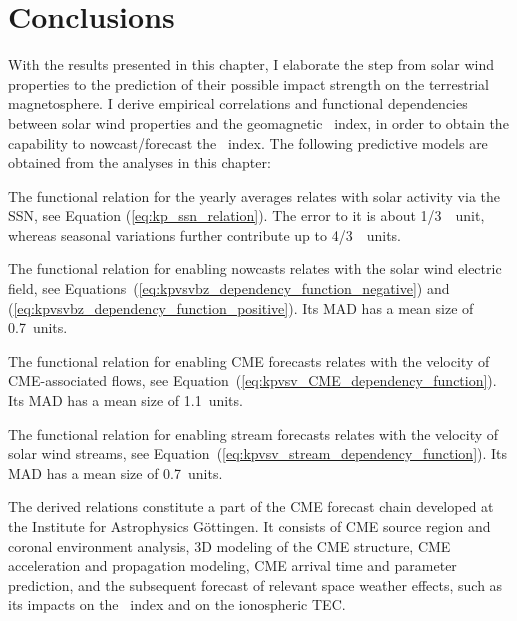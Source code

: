 

\section{Conclusions}
\label{sec:conclusions_ch2}
With the results presented in this chapter, I elaborate the step from solar wind properties to the prediction of their possible impact strength on the terrestrial magnetosphere. I derive empirical correlations and functional dependencies between solar wind properties and the geomagnetic \Kp~index, in order to obtain the capability to nowcast/forecast the \Kp~index. The following predictive models are obtained from the \Kp{} analyses in this chapter:
\begin{itemize*}
	\item The functional relation for the yearly \Kp{} averages relates \Kp{} with solar activity via the SSN, see Equation (\ref{eq:kp_ssn_relation}). The error to it is about 1/3~\Kp{}~unit, whereas seasonal variations further contribute up to 4/3~\Kp{}~units.
	\item The functional relation for enabling \Kp{} nowcasts relates \Kp{} with the solar wind electric field, see Equations~(\ref{eq:kpvsvbz_dependency_function_negative}) and (\ref{eq:kpvsvbz_dependency_function_positive}). Its MAD has a mean size of \SI{0.7}{\Kp}~units.
	\item The functional relation for enabling CME forecasts relates \Kp{} with the velocity of CME-associated flows, see Equation~(\ref{eq:kpvsv_CME_dependency_function}). Its MAD has a mean size of \SI{1.1}{\Kp}~units.
	\item The functional relation for enabling stream forecasts relates \Kp{} with the velocity of solar wind streams, see Equation~(\ref{eq:kpvsv_stream_dependency_function}). Its MAD has a mean size of \SI{0.7}{\Kp}~units.
\end{itemize*}

The derived \Kp{} relations constitute a part of the CME forecast chain developed at the Institute for Astrophysics Göttingen. It consists of CME source region and coronal environment analysis, 3D modeling of the CME structure, CME acceleration and propagation modeling, CME arrival time and parameter prediction, and the subsequent forecast of relevant space weather effects, such as its impacts on the \Kp~index and on the ionospheric TEC.

